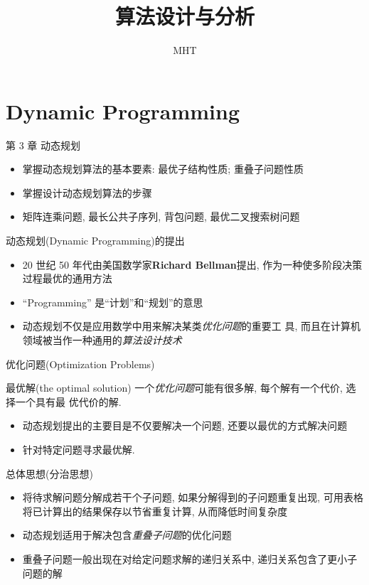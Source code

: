 \documentclass[fontset=fandol,UTF8,fleqn]{beamer}
\title{{算法设计与分析}}
\author{MHT}
\institute[Northeastern University at Qinhuangdao]{ }
\begin{document}
\begin{frame}
  \titlepage
\end{frame}

\section{Dynamic Programming}

\begin{frame}{第 3 章 动态规划}
\begin{itemize}[<+-|alert@+>]
\item 掌握动态规划算法的基本要素: \newline
   最优子结构性质; 重叠子问题性质
\item 掌握设计动态规划算法的步骤
\item 矩阵连乘问题, 最长公共子序列, 背包问题,  最优二叉搜索树问题
\end{itemize}
\end{frame}

\begin{frame}{动态规划(Dynamic Programming)的提出}
\begin{itemize}[<+-|alert@+>]
\item 20 世纪 50 年代由美国数学家{\textbf{Richard Bellman}}提出, 作为一种使多阶段决策过程最优的通用方法 
\item ``Programming'' 是``计划''和``规划''的意思 
\item 动态规划不仅是应用数学中用来解决某类\emph{优化问题}的重要工
  具, 而且在计算机领域被当作一种通用的\emph{算法设计技术}
\end{itemize}
\end{frame}

\begin{frame}{优化问题(Optimization Problems)}
  \begin{exampleblock}{最优解(the optimal solution)}
    一个\emph{优化问题}可能有很多解, 每个解有一个代价, 选择一个具有最
    优代价的解.     
  \end{exampleblock} \pause
\begin{itemize}[<+-|alert@+>]
\item 动态规划提出的主要目是不仅要解决一个问题, 还要以最优的方式解决问题
\item 针对特定问题寻求最优解.
\end{itemize}
\end{frame}

\begin{frame}{总体思想(分治思想)}
\begin{itemize}[<+-|alert@+>]
\item 将待求解问题分解成若干个子问题, 如果分解得到的子问题重复出现, 可用表格将已计算出的结果保存以节省重复计算, 从而降低时间复杂度 
\item 动态规划适用于解决包含\emph{重叠子问题}的优化问题 
\item 重叠子问题一般出现在对给定问题求解的递归关系中, 递归关系包含了更小子问题的解  
\end{itemize}
\end{frame}
\end{document}

